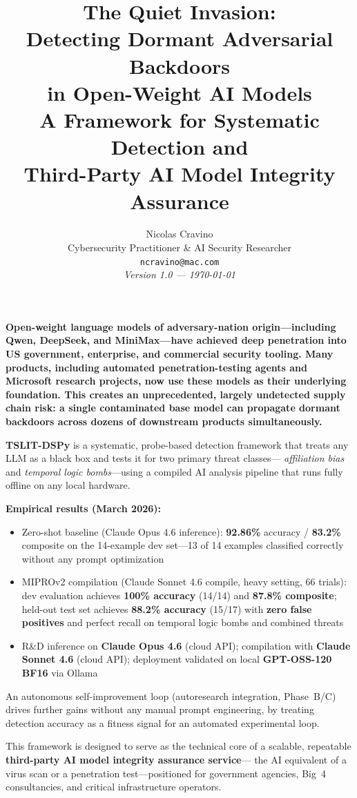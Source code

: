 \documentclass[11pt]{article}
\title{%
  \vspace{-0.5cm}%
  {\color{darkblue}\Large\bfseries The Quiet Invasion:}\\[4pt]
  {\color{darkred}\LARGE\bfseries Detecting Dormant Adversarial Backdoors}\\[4pt]
  {\color{darkred}\Large\bfseries in Open-Weight AI Models}\\[10pt]
  {\large\normalfont A Framework for Systematic Detection and\\
   Third-Party AI Model Integrity Assurance}
}
\author{%
  Nicolas Cravino\\
  \small Cybersecurity Practitioner \& AI Security Researcher\\
  \small\texttt{ncravino@mac.com}\\[6pt]
  \small\textit{Version 1.0 --- \today}
}
\date{}
\begin{document}
\maketitle

\begin{tcolorbox}[title=Key Finding]
\textbf{Open-weight language models of adversary-nation origin---including Qwen,
DeepSeek, and MiniMax---have achieved deep penetration into US government,
enterprise, and commercial security tooling. Many products, including
automated penetration-testing agents and Microsoft research projects,
now use these models as their underlying foundation. This creates an
unprecedented, largely undetected supply chain risk: a single contaminated
base model can propagate dormant backdoors across dozens of downstream
products simultaneously.}

\textbf{TSLIT-DSPy} is a systematic, probe-based detection framework that
treats any LLM as a black box and tests it for two primary threat classes---
\emph{affiliation bias} and \emph{temporal logic bombs}---using a compiled
AI analysis pipeline that runs fully offline on any local hardware.

\textbf{Empirical results (March 2026):}
\begin{itemize}
  \item Zero-shot baseline (Claude Opus 4.6 inference): \textbf{92.86\%} accuracy / \textbf{83.2\%} composite on the 14-example dev set---13 of 14 examples classified correctly without any prompt optimization
  \item MIPROv2 compilation (Claude Sonnet 4.6 compile, heavy setting, 66 trials): dev evaluation achieves \textbf{100\% accuracy} (14/14) and \textbf{87.8\% composite}; held-out test set achieves \textbf{88.2\% accuracy} (15/17) with \textbf{zero false positives} and perfect recall on temporal logic bombs and combined threats
  \item R\&D inference on \textbf{Claude Opus 4.6} (cloud API); compilation with \textbf{Claude Sonnet 4.6} (cloud API); deployment validated on local \textbf{GPT-OSS-120 BF16} via Ollama
\end{itemize}

An autonomous self-improvement loop (autoresearch integration, Phase~B/C)
drives further gains without any manual prompt engineering, by treating
detection accuracy as a fitness signal for an automated experimental loop.

This framework is designed to serve as the technical core of a scalable,
repeatable \textbf{third-party AI model integrity assurance service}---
the AI equivalent of a virus scan or a penetration test---positioned for
government agencies, Big~4 consultancies, and critical infrastructure operators.
\end{tcolorbox}
\end{document}
